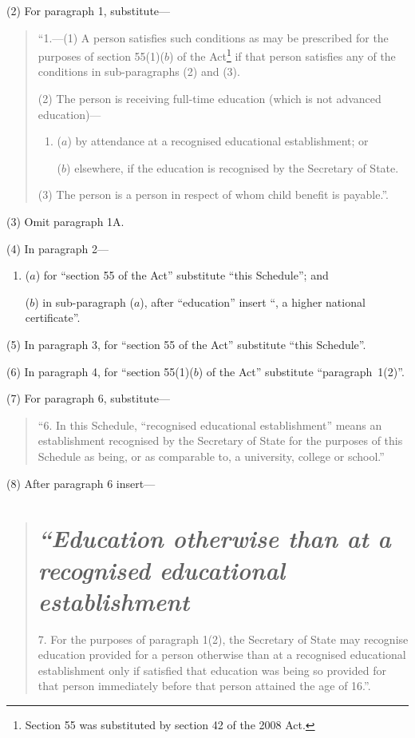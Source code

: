 \documentclass[12pt,a4paper]{article}
\begin{document}
(2) For paragraph 1, substitute—
\begin{quotation}
“1.---(1)   A person satisfies such conditions as may be prescribed for the purposes of section 55(1)($b$) of the Act\footnote{Section 55 was substituted by section 42 of the 2008 Act.} if that person satisfies any of the conditions in sub-paragraphs (2) and (3).

(2) The person is receiving full-time education (which is not advanced education)—
\begin{enumerate}\item[]
($a$) by attendance at a recognised educational establishment; or

($b$) elsewhere, if the education is recognised by the Secretary of State.
\end{enumerate}

(3) The person is a person in respect of whom child benefit is payable.”.
\end{quotation}

(3) Omit paragraph 1A.

(4) In paragraph 2—
\begin{enumerate}\item[]
($a$) for “section 55 of the Act” substitute “this Schedule”; and

($b$) in sub-paragraph ($a$), after “education” insert “, a higher national certificate”.
\end{enumerate}

(5) In paragraph 3, for “section 55 of the Act” substitute “this Schedule”.

(6) In paragraph 4, for “section 55(1)($b$)  of the Act” substitute “paragraph~1(2)”.

(7) For paragraph 6, substitute—
\begin{quotation}
“6.  In this Schedule, “recognised educational establishment” means an establishment recognised by the Secretary of State for the purposes of this Schedule as being, or as comparable to, a university, college or school.”
\end{quotation}

(8) After paragraph 6 insert—
\begin{quotation}
\section*{\itshape “Education otherwise than at a recognised educational establishment}

7.  For the purposes of paragraph 1(2), the Secretary of State may recognise education provided for a person otherwise than at a recognised educational establishment only if satisfied that education was being so provided for that person immediately before that person attained the age of 16.”.
\end{quotation}
\end{document}
